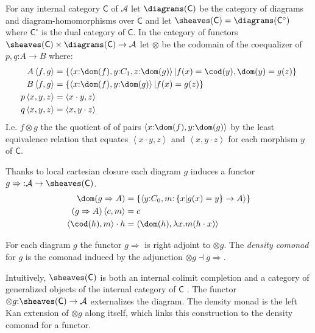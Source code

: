 \documentclass{tac}
\newcommand\hide[1]{}
\newcommand\cat\mathcal
\newcommand\icat\mathsf
\newcommand\of{\mathord:}
\newcommand\set[1]{\left\{#1\right\}}
\newcommand\dual{^\circ}
\newcommand\tuplet[1]{\left\langle #1 \right\rangle}
\begin{document}
\begin{definition}
For any internal category $\icat C$ of $\cat A$ 
let $\diagrams(\icat C)$ be the category of diagrams and diagram-homomorphisms over $\icat C$ and let $\sheaves(\icat C) = \diagrams(\icat C\dual)$ where $\icat C\dual$ is the dual category of $\icat C$. In the category of functors $\sheaves(\icat C)\times\diagrams(\icat C) \to\cat A$ let $\otimes$ be the codomain of the coequalizer of 
$p,q\of A\to B$ where:
\begin{align*}
A\tuplet{f,g} &= \set{\tuplet{x\of \dom(f),y\of C_1,z\of\dom(g)}|f(x) = \cod(y), \dom(y) = g(z)}\\
B\tuplet{f,g} &= \set{\tuplet{x\of \dom(f),y\of\dom(g)}|f(x) = g(z)}\\
p\tuplet{x,y,z}&=\tuplet{x\cdot y,z}\\
q\tuplet{x,y,z}&=\tuplet{x,y\cdot z}
\end{align*}
I.e. $f\otimes g$ the the quotient of of pairs $\tuplet{x\of\dom(f),y\of\dom(g)}$ by the least equivalence relation that equates $\tuplet{x\cdot y,z}$ and $\tuplet{x, y\cdot z}$ for each morphism $y$ of $\icat C$.

Thanks to local cartesian closure each diagram $g$ induces a functor $g\Rightarrow  \of \cat A\to \sheaves(\icat C)$.
\begin{align*}
\dom(g\Rightarrow A) &= \set{\tuplet{y\of C_0,m\of\set{x | g(x) = y}\to A}}\\
(g\Rightarrow A)\tuplet{c,m} &= c\\
 \tuplet{\cod(h),m}\cdot h &= \tuplet{\dom(h),\lambda x.m(h\cdot x)}
\end{align*}

For each diagram $g$ the functor $g\Rightarrow$ is right adjoint to $\otimes g$. 
The \emph{density comonad} for $g$ is the comonad induced by the adjunction $\otimes g\dashv g\Rightarrow$.
\end{definition}

Intuitively, $\sheaves(\icat C)$ is both an internal colimit completion and a category of generalized objects of the internal category of $\icat C$ . The functor $\otimes g\of \sheaves(\icat C) \to \cat A$ externalizes the diagram. The density monad is the left Kan extension of $\otimes g$ along itself, which links this construction to the density comonad for a functor.

\hide{
we will need to revisit the concepts and notions throughout this document

some guidelines:
- the greater the scope, the more descriptive the identifier
- keep refactoring
- define small generic components and compose them 
}
\end{document}
